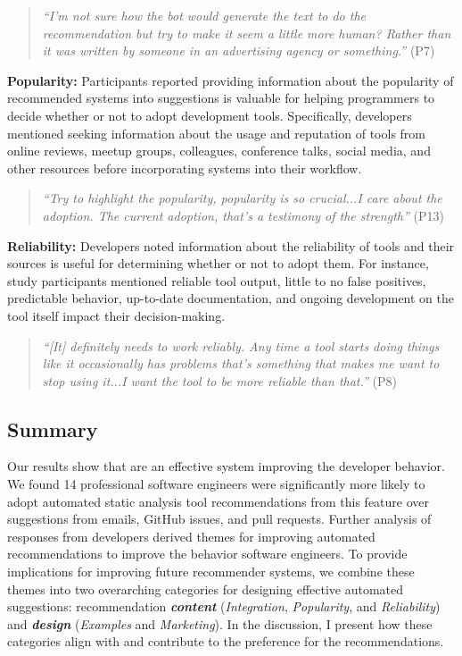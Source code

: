 \begin{quote}
\textit{``I'm not sure how the bot would generate the text to do the recommendation but try to make it seem a little more human? Rather than it was written by someone in an advertising agency or something.''} (P7)
\end{quote}

\textbf{Popularity:} Participants reported providing information about the popularity of recommended systems into suggestions is valuable for helping programmers to decide whether or not to adopt development tools. Specifically, developers mentioned seeking information about the usage and reputation of tools from online reviews, meetup groups, colleagues, conference talks, social media, and other resources before incorporating systems into their workflow.

\begin{quote}
    \textit{``Try to highlight the popularity, popularity is so crucial...I care about the adoption. The current adoption, that’s a testimony of the strength''} (P13)
\end{quote}

\textbf{Reliability:} Developers noted information about the reliability of tools and their sources is useful for determining whether or not to adopt them. For instance, study participants mentioned reliable tool output, little to no false positives, predictable behavior, up-to-date documentation, and ongoing development on the tool itself impact their decision-making.

\begin{quote}
    \textit{``[It] definitely needs to work reliably. Any time a tool starts doing things like it occasionally has problems that’s something that makes me want to stop using it...I want the tool to be more reliable than that.''} (P8)
\end{quote}

\subsection{Summary}

Our results show that \suggs are an effective system improving the developer behavior. We found 14 professional software engineers were significantly more likely to adopt automated static analysis tool recommendations from this feature over suggestions from emails, GitHub issues, and pull requests. Further analysis of responses from developers derived themes for improving automated recommendations to improve the behavior software engineers. To provide implications for improving future recommender systems, we combine these themes into two overarching categories for designing effective automated suggestions: recommendation \textbf{\em content} (\textit{Integration}, \textit{Popularity}, and \textit{Reliability}) and \textbf{\em design} (\textit{Examples} and \textit{Marketing}). In the discussion, I present how these categories align with \framework and contribute to the preference for the \suggs recommendations.

